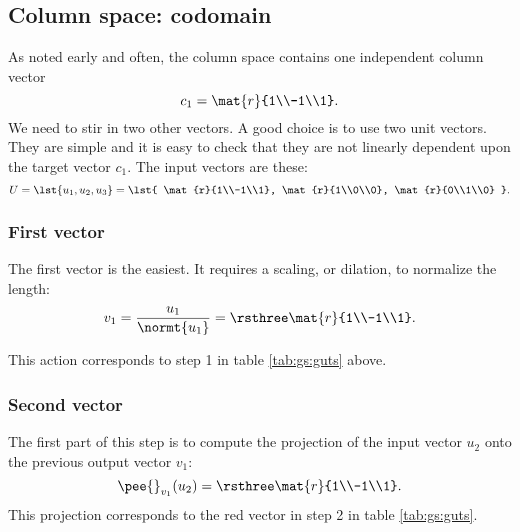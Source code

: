 \subsection{Column space: codomain}
As noted early and often, the column space contains one independent column vector
\begin{equation}
  c_{1} = \mat{r}{1\\-1\\1}.
\end{equation}
We need to stir in two other vectors. A good choice is to use two unit vectors. They are simple and it is easy to check that they are not linearly dependent upon the target vector $c_{1}$. The input vectors are these:
\begin{equation}
  U = \lst{u_{1},u_{2},u_{3}} = \lst{
  \mat{r}{1\\-1\\1},
  \mat{r}{1\\0\\0},
  \mat{r}{0\\1\\0}
  }.
\end{equation}

\subsubsection{First vector}
The first vector is the easiest. It requires a scaling, or dilation, to normalize the length:
\begin{equation}
  v_{1} = \frac{u_{1}}{\normt{u_{1}}} = \rsthree
  \mat{r}{1\\-1\\1}.
\end{equation}

This action corresponds to step 1 in table \eqref{tab:gs:guts} above.

\subsubsection{Second vector}
The first part of this step is to compute the projection of the input vector $u_{2}$ onto the previous output vector $v_{1}$:
\begin{equation}
  \pee{}_{v_{1}}(u_{2}) = \rsthree\mat{r}{1\\-1\\1}.
\end{equation}
This projection corresponds to the red vector in step 2 in table \eqref{tab:gs:guts}.

